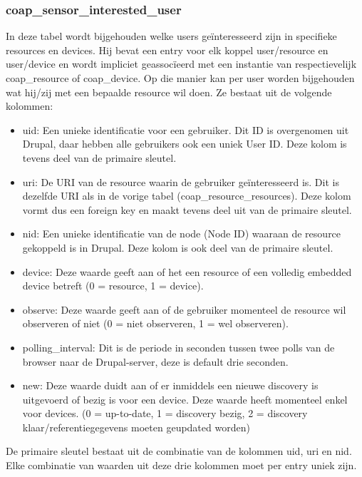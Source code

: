 \subsubsection{coap\_sensor\_interested\_user}
In deze tabel wordt bijgehouden welke users ge\"{i}nteresseerd zijn in specifieke resources en devices. Hij bevat een entry voor elk koppel user/resource en user/device en wordt impliciet geassoc\"{i}eerd met een instantie van respectievelijk coap\_resource of coap\_device. Op die manier kan per user worden bijgehouden wat hij/zij met een bepaalde resource wil doen. Ze bestaat uit de volgende kolommen:
\begin{itemize}
\item uid: Een unieke identificatie voor een gebruiker. Dit ID is overgenomen uit Drupal, daar hebben alle gebruikers ook een uniek User ID. Deze kolom is tevens deel van de primaire sleutel.
\item uri: De URI van de resource waarin de gebruiker ge\"{i}nteresseerd is. Dit is dezelfde URI als in de vorige tabel (coap\_resource\_resources). Deze kolom vormt dus een foreign key en maakt tevens deel uit van de primaire sleutel.
\item nid: Een unieke identificatie van de node (Node ID) waaraan de resource gekoppeld is in Drupal. Deze kolom is ook deel van de primaire sleutel.
\item device: Deze waarde geeft aan of het een resource of een volledig embedded device betreft (0 = resource, 1 = device).
\item observe: Deze waarde geeft aan of de gebruiker momenteel de resource wil observeren of niet (0 = niet observeren, 1 = wel observeren).
\item polling\_interval: Dit is de periode in seconden tussen twee polls van de browser naar de Drupal-server, deze is default drie seconden.
\item new: Deze waarde duidt aan of er inmiddels een nieuwe discovery is uitgevoerd of bezig is voor een device. Deze waarde heeft momenteel enkel voor devices. (0 = up-to-date, 1 = discovery bezig, 2 = discovery klaar/referentiegegevens moeten geupdated worden)
\end{itemize}
De primaire sleutel bestaat uit de combinatie van de kolommen uid, uri en nid. Elke combinatie van waarden uit deze drie kolommen moet per entry uniek zijn.


